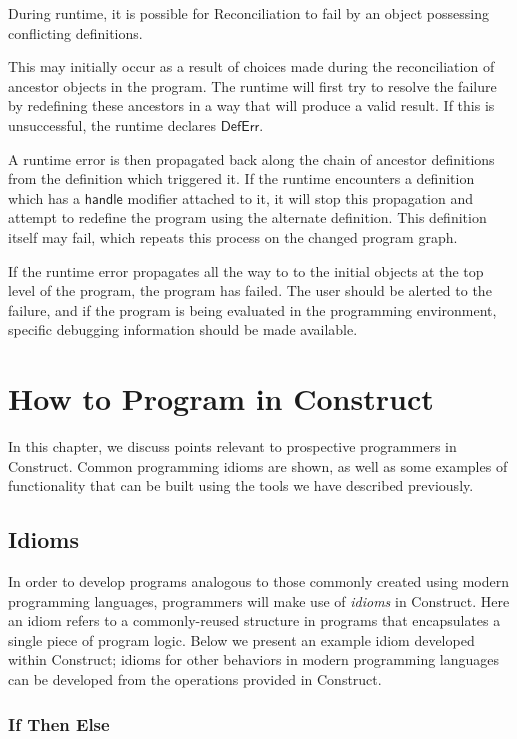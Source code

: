 \documentclass[twoside,openright,11pt]{report}
\begin{document}
During runtime, it is possible for Reconciliation to fail by an object possessing conflicting definitions. 

This may initially occur as a result of choices made during the reconciliation of ancestor objects in the program. 
The runtime will first try to resolve the failure by redefining these ancestors in a way that will produce a valid result. 
If this is unsuccessful, the runtime declares $\mathsf{DefErr}$.

A runtime error is then propagated back along the chain of ancestor definitions from the definition which triggered it. 
If the runtime encounters a definition which has a $\mathsf{handle}$ modifier attached to it, it will stop this propagation and attempt to redefine the program using the alternate definition.
This definition itself may fail, which repeats this process on the changed program graph.

If the runtime error propagates all the way to to the initial objects at the top level of the program, the program has failed. 
The user should be alerted to the failure, and if the program is being evaluated in the programming environment, specific debugging information should be made available.

\chapter{How to Program in Construct}
\label{chap:howto}

In this chapter, we discuss points relevant to prospective programmers in Construct. Common programming idioms are shown, as well as some examples of functionality that can be built using the tools we have described previously.

\section{Idioms}
\label{sec:idioms}

In order to develop programs analogous to those commonly created using modern programming languages, programmers will make use of {\it idioms} in Construct.
Here an idiom refers to a commonly-reused structure in programs that encapsulates a single piece of program logic.
Below we present an example idiom developed within Construct; idioms for other behaviors in modern programming languages can be developed from the operations provided in Construct.

\subsection{If Then Else}
\label{subsec:if}
\end{document}
